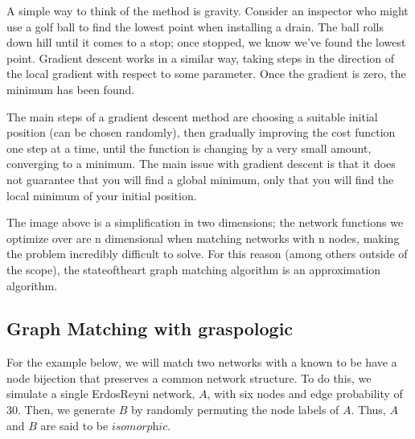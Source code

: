 \documentclass[letterpaper,10pt,english]{jupyterBook}
\begin{document}
\sphinxAtStartPar
A simple way to think of the method is gravity.  Consider an inspector who might use a golf ball to find the lowest point when installing a drain. The ball rolls down hill until it comes to a stop; once stopped, we know we’ve found the lowest point. Gradient descent works in a similar way, taking steps in the direction of the local gradient with respect to some parameter. Once the gradient is zero, the minimum has been found.

\sphinxAtStartPar
The main steps of a gradient descent method are choosing a suitable initial position (can be chosen randomly), then gradually improving the cost function one step at a time, until the function is changing by a very small amount, converging to a minimum. The main issue with gradient descent is that it does not guarantee that you will find a global minimum, only that you will find the local minimum of your initial position.

\sphinxAtStartPar
{}

\sphinxAtStartPar
The image above is a simplification in two dimensions; the network functions we optimize over are n dimensional when matching networks with n nodes, making the problem incredibly difficult to solve. For this reason (among others outside of the scope), the state\sphinxhyphen{}of\sphinxhyphen{}the\sphinxhyphen{}art graph matching algorithm is an approximation algorithm.


\subsection{Graph Matching with graspologic}
\label{\detokenize{applications/ch9/graph-matching-vertex:graph-matching-with-graspologic}}
\sphinxAtStartPar
For the example below, we will match two networks with a known to be have a node bijection that preserves a common network structure. To do this, we simulate a single Erdos\sphinxhyphen{}Reyni network, \(A\), with six nodes and edge probability of 30. Then, we generate \(B\) by randomly permuting the node labels of \(A\). Thus, \(A\) and \(B\) are said to be \(\textit{isomorphic}\).
\end{document}
